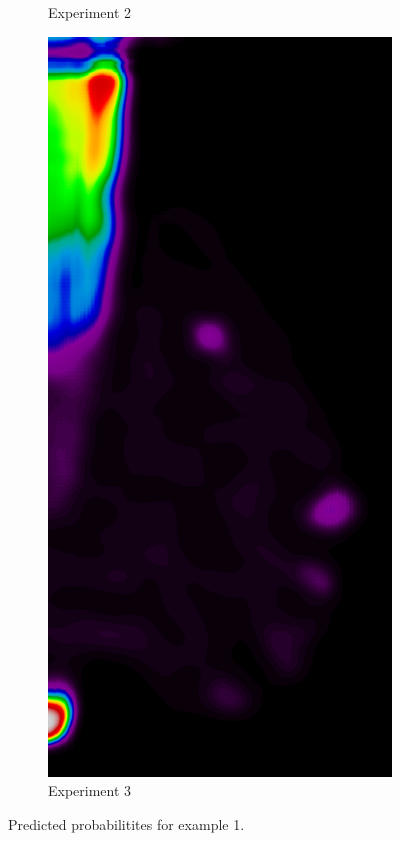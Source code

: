 \begin{figure}[h!]
\begin{subfigure}{0.195\textwidth}
		\caption{Experiment 2}
    \end{subfigure}
    \begin{subfigure}{0.195\textwidth}
		\centering
			\includegraphics[width=\textwidth]{plots/examples/example1_probs_3.png}
		\caption{Experiment 3}
    \end{subfigure}
	\caption[Predictions for example 1]{Predicted probabilitites for example 1.}
\end{figure}

